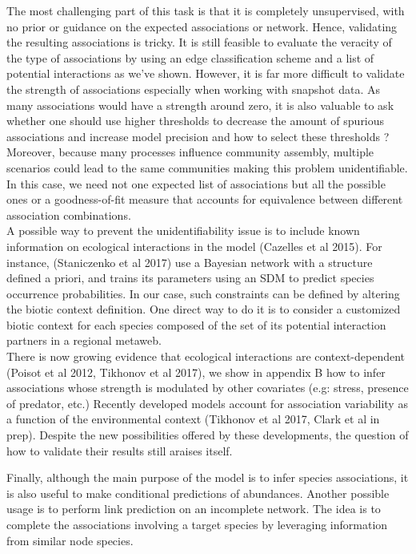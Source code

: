 \documentclass[]{article}
\begin{document}
\noindent The most challenging part of this task is that it is completely unsupervised, with no prior or guidance on the expected associations or network. Hence, validating the resulting associations is tricky. It is still feasible to evaluate the veracity of the type of associations by using an edge classification scheme and a list of potential interactions as we've shown. However, it is far more difficult to validate the strength of associations especially when working with snapshot data. As many associations would have a strength around zero, it is also valuable to ask whether one should use higher thresholds to decrease the amount of spurious associations and increase model precision and how to select these thresholds ? Moreover, because many processes influence community assembly, multiple scenarios could lead to the same communities making this problem unidentifiable. In this case, we need not one expected list of associations but all the possible ones or a goodness-of-fit measure that accounts for equivalence between different association combinations. \\

\noindent A possible way to prevent the unidentifiability issue is to include known information on ecological interactions in the model (Cazelles et al 2015). For instance, (Staniczenko et al 2017) use a Bayesian network with a structure defined a priori, and trains its parameters using an SDM to predict species occurrence probabilities. In our case, such constraints can be defined by altering the biotic context definition. One direct way to do it is to consider a customized biotic context for each species composed of the set of its potential interaction partners in a regional metaweb. \\

\noindent There is now growing evidence that ecological interactions are context-dependent (Poisot et al 2012, Tikhonov et al 2017), we show in appendix B how to infer associations whose strength is modulated by other covariates (e.g: stress, presence of predator, etc.) Recently developed models account for association variability as a function of the environmental context (Tikhonov et al 2017, Clark et al in prep). Despite the new possibilities offered by these developments, the question of how to validate their results still araises itself.

\noindent Finally, although the main purpose of the model is to infer species associations, it is also useful to make conditional predictions of abundances. Another possible usage is to perform link prediction on an incomplete network. The idea is to complete the associations involving a target species by leveraging information from similar node species. \\ 
          
\end{document}
